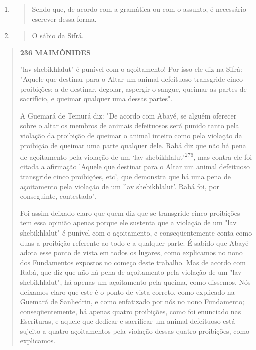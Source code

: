 \begin{enumerate}
\def\labelenumi{\arabic{enumi}.}
\setcounter{enumi}{273}
\item
  \begin{quote}
  Sendo que, de acordo com a gramática ou com o assunto, é necessário
  escrever dessa forma.
  \end{quote}
\item
  \begin{quote}
  O sábio da Sifrá.
  \end{quote}
\end{enumerate}

\begin{quote}
\textbf{236 MAIMÔNIDES}

"lav shebikhlalut" é punível com o açoitamento! Por isso ele diz na
Sifrá: "Aquele que destinar para o Altar um animal defeituoso transgride
cinco proibições: a de destinar, degolar, aspergir o sangue, queimar as
partes de sacrifício, e quei­mar qualquer uma dessas partes".

A Guemará de Temurá diz: "De acordo com Abayé, se alguém ofe­recer sobre
o altar os membros de animais defeituosos será punido tanto pela
violação da proibição de queimar o animal inteiro como pela violação da
proi­bição de queimar uma parte qualquer dele. Rabá diz que não há pena
de açoita­mento pela violação de um `lav
shebikhlalut'\textsuperscript{276}, mas contra ele foi citada a
afir­mação 'Aquele que destinar para o Altar um animal defeituoso
transgride cinco proibições, etc', que demonstra que há uma pena de
açoitamento pela violação de um 'lav shebikhlalut'. Rabá foi, por
conseguinte, contestado".

Foi assim deixado claro que quem diz que se transgride cinco proi­bições
tem essa opinião apenas porque ele sustenta que a violação de um "lav
shebikhlalut" é punível com o açoitamento, e conseqüentemente conta como
duas a proibição referente ao todo e a qualquer parte. É sabido que
Abayé ado­ta esse ponto de vista em todos os lugares, como explicamos no
nono dos Fun­damentos expostos no começo deste trabalho. Mas de acordo
com Rabá, que diz que não há pena de açoitamento pela violação de um
"lav shebikhlalut", há apenas um açoitamento pela queima, como dissemos.
Nós deixamos claro que este é o ponto de vista correto, como explicado
na Guemará de Sanhedrin, e como enfatizado por nós no nono Fundamento;
conseqüentemente, há ape­nas quatro proibições, como foi enunciado nas
Escrituras, e aquele que dedicar e sacrificar um animal defeituoso está
sujeito a quatro açoitamentos pela viola­ção dessas quatro proibições,
como explicamos.


\end{quote}
